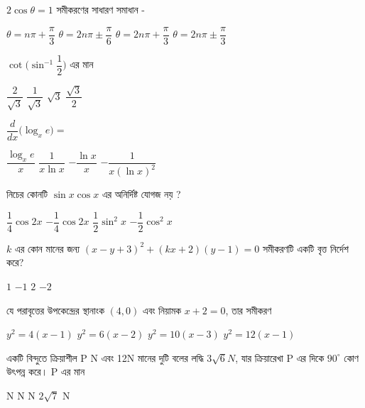 \documentclass[addpoints]{exam}
\begin{document}
\begin{questions}
\question $ 2\cos\theta =1 $ সমীকরণের সাধারণ সমাধান -

\begin{oneparchoices}
\choice $ \theta = n\pi + \dfrac{\pi}{3} $
\choice $ \theta = 2n\pi \pm \dfrac{\pi}{6} $
\choice $ \theta = 2n\pi + \dfrac{\pi}{3} $
\choice $ \theta = 2n\pi \pm \dfrac{\pi}{3} $
\end{oneparchoices}

\question $ \cot\Big(\sin^{-1}\dfrac{1}{2}\Big) $ এর মান

\begin{oneparchoices}
\choice $ \dfrac{2}{\sqrt{3}} $
\choice $ \dfrac{1}{\sqrt{3}} $
\choice $ \sqrt{3} $
\choice $ \dfrac{\sqrt{3}}{2} $
\end{oneparchoices}

\question $ \dfrac{d}{dx}\Big( \log_{x}e \Big) = $ 

\begin{oneparchoices}
\choice $ \dfrac{\log_{x}e}{x} $
\choice $ \dfrac{1}{x\ln x} $
\choice $ -\dfrac{\ln x}{x} $
\choice $ -\dfrac{1}{x(\ln x)^{2}} $
\end{oneparchoices}

\question নিচের কোনটি $ \sin x\cos x $  এর অনির্দিষ্ট যোগজ নয় ?

\begin{oneparchoices}
\choice $ \dfrac{1}{4}\cos 2x $
\choice  $- \dfrac{1}{4}\cos 2x $
\choice  $ \dfrac{1}{2}\sin^{2} x $
\choice $ -\dfrac{1}{2}\cos^{2} x $
\end{oneparchoices}

\question  $ k $ এর কোন মানের জন্য $ (x-y+3)^{2} + (kx+2)(y-1) = 0 $ সমীকরণটি একটি বৃত্ত নির্দেশ করে?

\begin{oneparchoices}
\choice $ 1 $
\choice $ -1 $
\choice $ 2 $
\choice $ -2 $
\end{oneparchoices}

\question  যে পরাবৃত্তের উপকেন্দ্রের স্থানাংক $ (4,0) $ এবং নিয়ামক $ x+2=0 $, তার সমীকরণ 

\begin{oneparchoices}
\choice $ y^{2}=4(x-1) $
\choice $ y^{2}=6(x-2) $
\choice $ y^{2}=10(x-3) $
\choice $ y^{2}=12(x-1) $
\end{oneparchoices}

\question  একটি বিন্দুতে ক্রিয়াশীল P N এবং 12N মানের দুটি বলের লদ্ধি $ 3\sqrt{6}N $, যার ক্রিয়ারেখা P এর দিকে $ 90^{\circ} $ কোণ উৎপন্ন করে। P এর মান 

\begin{oneparchoices}
 N
 N
 N
\choice $ 2\sqrt{7} $ N
\end{oneparchoices}


\end{questions}
\end{document}
